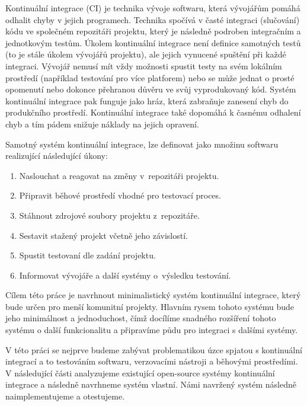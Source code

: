 \begin{introduction}

Kontinuální integrace (CI) je technika vývoje softwaru, která vývojářům pomáhá odhalit chyby v jejich programech.
Technika spočívá v časté integraci (slučování) kódu ve společném repozitáři projektu, který je následně podroben integračním a jednotkovým testům.
Úkolem kontinuální integrace není definice samotných testů (to je stále úkolem vývojářů projektu), ale jejich vynucené spuštění při každé integraci.
Vývojář nemusí mít vždy možnosti spustit testy na svém lokálním prostředí (například testování pro více platforem) nebo se může jednat o prosté opomenutí nebo dokonce přehranou důvěru ve svůj vyprodukovaný kód.
Systém kontinuální integrace pak funguje jako hráz, která zabraňuje zanesení chyb do produkčního prostředí.
Kontinuální integrace také dopomáhá k časnému odhalení chyb a tím pádem snižuje náklady na jejich opravení.

Samotný systém kontinuální integrace, lze definovat jako množinu softwaru realizující následující úkony:

\begin{enumerate}
	\item Naslouchat a reagovat na změny v~repozitáři projektu.
	\item Připravit běhové prostředí vhodné pro testovací proces.
	\item Stáhnout zdrojové soubory projektu z~repozitáře.
	\item Sestavit stažený projekt včetně jeho závislostí.
	\item Spustit testovaní dle zadání projektu.
	\item Informovat vývojáře a další systémy o~výsledku testování.
\end{enumerate}

Cílem této práce je navrhnout minimalistický systém kontinuální integrace, který bude určen pro menší komunitní projekty.
Hlavním rysem tohoto systému bude jeho minimálnost a jednoduchost, čímž docílíme snadného rozšíření tohoto systému o další funkcionalitu a připravíme půdu pro integraci s dalšími systémy.

V této práci se nejprve budeme zabývat problematikou úzce spjatou s kontinuální integrací a to testováním softwaru, verzovacími nástroji a běhovými prostředími.
V následující části analyzujeme existující open-source systémy kontinuální integrace a následně navrhneme systém vlastní.
Námi navržený systém následně naimplementujeme a otestujeme.

\end{introduction}
